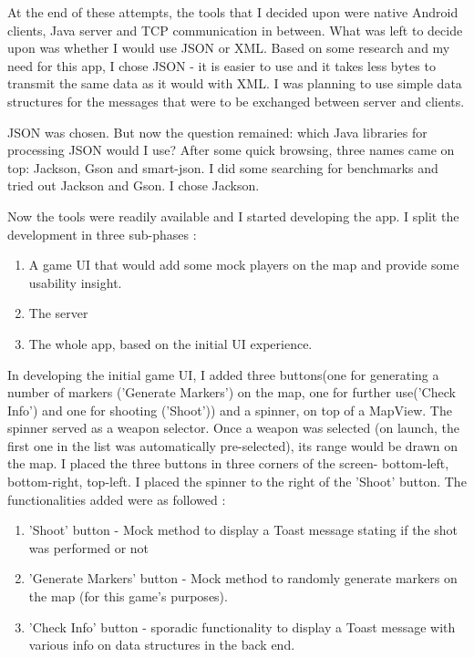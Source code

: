 \documentclass{article}
\begin{document}
At the end of these attempts, the tools that I decided upon were native Android
clients, Java server and TCP communication in between. What was left to decide
upon was whether I would use JSON or XML. Based on some research and my need for
this app, I chose JSON - it is easier to use and it takes less bytes to transmit
the same data as it would with XML. I was planning to use simple data structures
for the messages that were to be exchanged between server and clients.\newline

JSON was chosen. But now the question remained: which Java libraries for
processing JSON would I use? After some quick browsing, three names came on top:
Jackson, Gson and smart-json. I did some searching for benchmarks and tried out
Jackson and Gson. I chose Jackson.\newline

Now the tools were readily available and I started developing the app. I split
the development in three sub-phases : 
\begin{enumerate}
  \item A game UI that would add some mock players on the map and provide some
  usability insight.
  \item The server
  \item The whole app, based on the initial UI experience.
\end{enumerate}

In developing the initial game UI, I added three buttons(one for generating a
number of markers ('Generate Markers') on the map, one for further use('Check
Info') and one for shooting ('Shoot')) and a spinner, on top of a MapView. The
spinner served as a weapon selector. Once a weapon was selected (on launch, the
first one in the list was automatically pre-selected), its range would be
drawn on the map. I placed the three buttons in three corners of the screen-
bottom-left, bottom-right, top-left. I placed the spinner to the right of the
'Shoot' button. The functionalities added were as followed :
\begin{enumerate}
  \item 'Shoot' button - Mock method to display a Toast message stating if the
  shot was performed or not
  
  \item 'Generate Markers' button - Mock method to randomly generate markers on
  the map (for this game's purposes).
  
  \item 'Check Info' button - sporadic functionality to display a Toast message
  with various info on data structures in the back end.
\end{enumerate}
\end{document}
